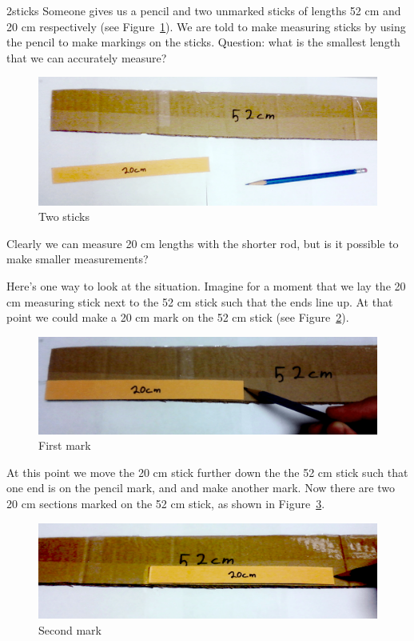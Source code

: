 \begin{example}{2sticks} Someone gives us a pencil and two unmarked sticks of lengths 52 cm and  20 cm respectively (see Figure~\ref{fig:1euclidean}). We are told to make measuring sticks by using the pencil to make markings on the sticks. Question: what is the smallest length that we can accurately measure? 
\begin{figure}
\begin{center} 
\includegraphics[width=1.00\textwidth]{images/2_sticks_step1.png}
\end {center}
\caption{Two sticks\label{fig:1euclidean}}
\end{figure}
Clearly we can measure 20 cm lengths with the shorter rod, but is it possible to make smaller measurements?

Here's one way to look at the situation. Imagine for a moment that we lay the 20 cm measuring stick next to the 52 cm stick such that the ends line up.  At that point we could make a 20 cm mark on the 52 cm stick (see Figure~\ref{fig:2}).
\begin{figure}
\begin{center} 
\includegraphics[width=1.00\textwidth]{images/2_sticks_step2.png}
\end {center}
\caption{First mark\label{fig:2}}
\end{figure}

\noindent At this point we move the 20 cm stick further down the the 52 cm stick such that one end is on the pencil mark, and and make another mark.  Now there are two 20 cm sections marked on the 52 cm stick, 
as shown in Figure~\ref{fig:3}.  
\begin{figure}
\begin{center}
	\includegraphics[width=1.00\textwidth]{images/2_sticks_step3.png}
\end{center}
\caption{Second mark\label{fig:3}}
\end{figure}


\end{example}
